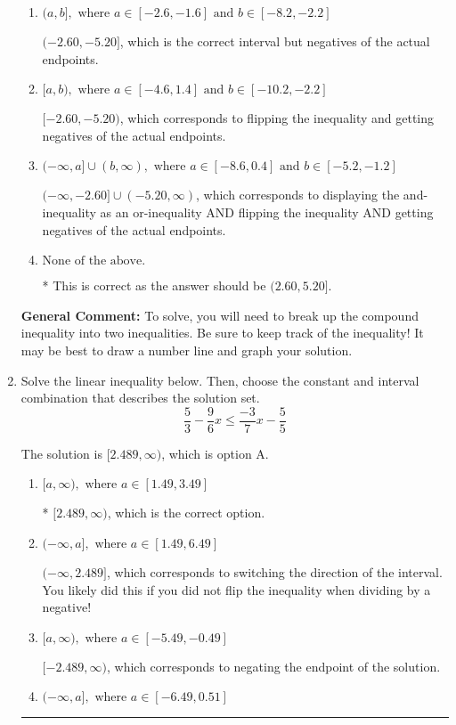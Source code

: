 \documentclass{extbook}[14pt]
\newcommand{\litem}[1]{\item #1

\rule{\textwidth}{0.4pt}}
\begin{document}
\begin{enumerate}
{\begin{enumerate}[label=\Alph*.]
$(-\infty, -2.60) \cup [-5.20, \infty)$, which corresponds to displaying the and-inequality as an or-inequality and getting negatives of the actual endpoints.
\item \( (a, b], \text{ where } a \in [-2.6, -1.6] \text{ and } b \in [-8.2, -2.2] \)

$(-2.60, -5.20]$, which is the correct interval but negatives of the actual endpoints.
\item \( [a, b), \text{ where } a \in [-4.6, 1.4] \text{ and } b \in [-10.2, -2.2] \)

$[-2.60, -5.20)$, which corresponds to flipping the inequality and getting negatives of the actual endpoints.
\item \( (-\infty, a] \cup (b, \infty), \text{ where } a \in [-8.6, 0.4] \text{ and } b \in [-5.2, -1.2] \)

$(-\infty, -2.60] \cup (-5.20, \infty)$, which corresponds to displaying the and-inequality as an or-inequality AND flipping the inequality AND getting negatives of the actual endpoints.
\item \( \text{None of the above.} \)

* This is correct as the answer should be $(2.60, 5.20]$.
\end{enumerate}

\textbf{General Comment:} To solve, you will need to break up the compound inequality into two inequalities. Be sure to keep track of the inequality! It may be best to draw a number line and graph your solution.
}
\litem{
Solve the linear inequality below. Then, choose the constant and interval combination that describes the solution set.
\[ \frac{5}{3} - \frac{9}{6} x \leq \frac{-3}{7} x - \frac{5}{5} \]

The solution is \( [2.489, \infty) \), which is option A.\begin{enumerate}[label=\Alph*.]
\item \( [a, \infty), \text{ where } a \in [1.49, 3.49] \)

* $[2.489, \infty)$, which is the correct option.
\item \( (-\infty, a], \text{ where } a \in [1.49, 6.49] \)

 $(-\infty, 2.489]$, which corresponds to switching the direction of the interval. You likely did this if you did not flip the inequality when dividing by a negative!
\item \( [a, \infty), \text{ where } a \in [-5.49, -0.49] \)

 $[-2.489, \infty)$, which corresponds to negating the endpoint of the solution.
\item \( (-\infty, a], \text{ where } a \in [-6.49, 0.51] \)


\end{enumerate}}
\end{enumerate}
\end{document}
